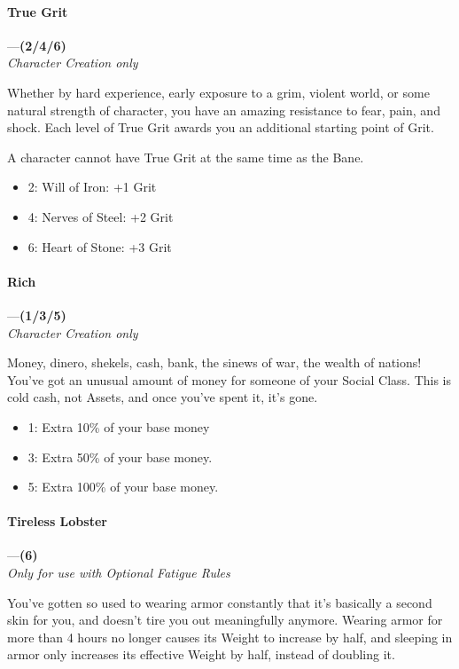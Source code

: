 \documentclass[oneside,11pt,english]{book}
\begin{document}
\paragraph{\label{boon:True Grit}True Grit}---\quad\textbf{(2/4/6) }\\
\emph{Character Creation only}

Whether by hard experience, early exposure to a grim, violent world, or some natural strength of 
character, you have an amazing resistance to fear, pain, and shock. Each level of True Grit awards you an 
additional starting point of Grit. 

A character cannot have True Grit at the same time as the  Bane.
\begin{itemize}
\item 2: Will of Iron: +1 Grit 
\item 4: Nerves of Steel: +2 Grit 
\item 6: Heart of Stone: +3 Grit 
\end{itemize}
\paragraph{\label{boon:Rich}Rich}---\quad\textbf{(1/3/5) }\\
\textit{Character Creation only}\par
Money, dinero, shekels, cash, bank, the sinews of war, the wealth of nations! You've got an unusual 
amount of money for someone of your Social Class. This is cold cash, not Assets, and once you've spent 
it, it's gone. 
\begin{itemize}
\item 1: Extra 10\% of your base money 
\item 3: Extra 50\% of your base money. 
\item 5: Extra 100\% of your base money. 
\end{itemize}
\paragraph{\label{boon:Tireless Lobster}Tireless Lobster}---\quad\textbf{(6)}\\
\textit{Only for use with Optional Fatigue Rules}

You’ve gotten so used to wearing armor constantly that it’s basically a second skin for you, and doesn’t tire you out meaningfully anymore. Wearing armor for more than 4 hours no longer causes its Weight to increase by half, and sleeping in armor only increases its effective Weight by half, instead of doubling it.
\end{document}
